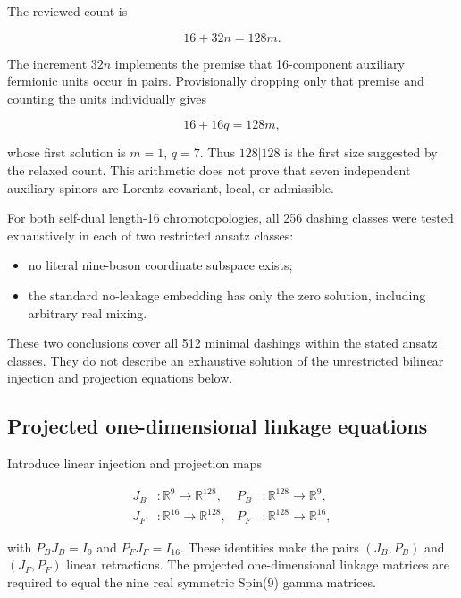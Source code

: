 \documentclass[11pt]{article}
\begin{document}
The reviewed count is

\begin{equation}
16+32n=128m.
\end{equation}

The increment $32n$ implements the premise that 16-component auxiliary
fermionic units occur in pairs.  Provisionally dropping only that premise and
counting the units individually gives

\begin{equation}
16+16q=128m,
\end{equation}

whose first solution is $m=1$, $q=7$.  Thus $128\vert128$ is the first size
suggested by the relaxed count.  This arithmetic does not prove that seven
independent auxiliary spinors are Lorentz-covariant, local, or admissible.

For both self-dual length-16 chromotopologies, all 256 dashing classes were
tested exhaustively in each of two restricted ansatz classes:

\begin{itemize}
  \item no literal nine-boson coordinate subspace exists;
  \item the standard no-leakage embedding has only the zero solution, including
        arbitrary real mixing.
\end{itemize}

These two conclusions cover all 512 minimal dashings within the stated
ansatz classes.  They do not describe an exhaustive solution of the unrestricted
bilinear injection and projection equations below.

\subsection{Projected one-dimensional linkage equations}

Introduce linear injection and projection maps

\begin{equation}
\begin{aligned}
J_B &: \mathbb R^9\longrightarrow\mathbb R^{128}, &
P_B &: \mathbb R^{128}\longrightarrow\mathbb R^9,\\
J_F &: \mathbb R^{16}\longrightarrow\mathbb R^{128}, &
P_F &: \mathbb R^{128}\longrightarrow\mathbb R^{16},
\end{aligned}
\end{equation}

with $P_BJ_B=I_9$ and $P_FJ_F=I_{16}$.  These identities make the pairs
$(J_B,P_B)$ and $(J_F,P_F)$ linear retractions.  The projected
one-dimensional linkage matrices are required to equal the nine real symmetric
Spin(9) gamma matrices.
\end{document}
